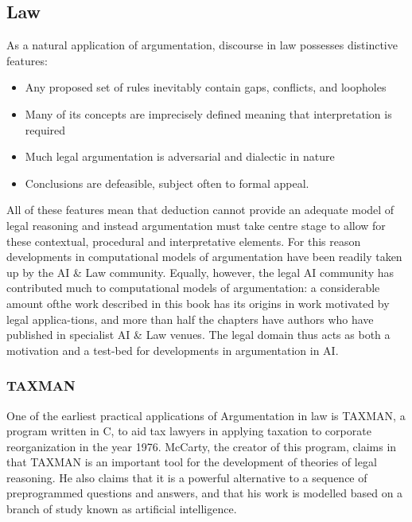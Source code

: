\documentclass[sigconf]{acmart}
\begin{document}
\subsection{Law}
As a natural application of argumentation, discourse in law possesses distinctive features:
\begin{itemize}
  \item Any proposed set of rules inevitably contain gaps, conflicts, and loopholes
  \item Many of its concepts are imprecisely defined meaning that interpretation is required
  \item Much legal argumentation is adversarial and dialectic in nature
  \item Conclusions are defeasible, subject often to formal appeal.
\end{itemize}
All of these features mean that deduction cannot provide an adequate model of legal reasoning and instead argumentation must take centre stage to allow for these contextual, procedural and interpretative elements. For this reason developments in computational models of argumentation have been readily taken up by the AI \& Law community. Equally, however, the legal AI community has contributed much to computational models of argumentation: a considerable amount ofthe work described in this book has its origins in work motivated by legal applica-tions, and more than half the chapters have authors who have published in specialist AI \& Law venues. The legal domain thus acts as both a motivation and a test-bed for developments in argumentation in AI.

\subsubsection{TAXMAN} One of the earliest practical applications of Argumentation in law is TAXMAN, a program written in C, to aid tax lawyers in applying taxation to corporate reorganization in the year 1976. McCarty, the creator of this program, claims in \cite{mccarty1976reflections} that TAXMAN is an important tool for the development of theories of legal reasoning. He also claims that it is a powerful alternative to a sequence of preprogrammed questions and answers, and that his work is modelled based on a branch of study known as artificial intelligence.
\end{document}
